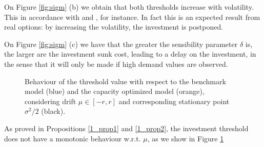 On Figure \ref{fig:sigm} (b) we obtain that both thresholds increase with volatility. This in accordance with \cite{hagspiel:cap} and \cite{rita}, for instance. In fact this is an expected result from real options: by increasing the volatility, the investment is postponed.

On Figure \ref{fig:sigm} (c) we have that the greater the sensibility parameter $\delta$ is, the larger are the investment sunk cost, leading to a delay on the investment, in the sense that it will only be made if high demand values are observed.

\begin{figure}[!htb]
	\begin{subfigmatrix}{2}
	\end{subfigmatrix}
	\caption{Behaviour of the threshold value with respect to the benchmark model (blue) and the capacity optimized model (orange), considering drift $\mu \in [-r, r]$ and corresponding stationary point $\sigma^2/2$ (black).}
	\label{fig:mu}
\end{figure}

As proved in Propositions \ref{1_prop1} and \ref{1_prop2}, the investment threshold does not have a monotonic behaviour w.r.t. $\mu$, as we show in Figure \ref{fig:mu}

